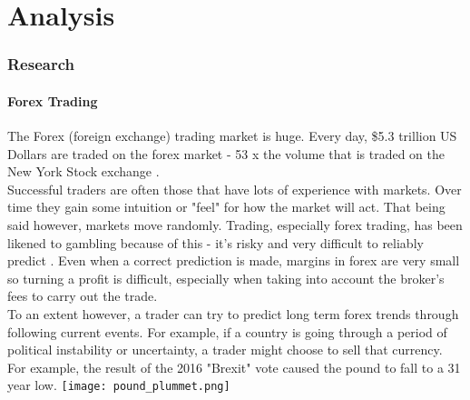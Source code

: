 
\iffalse
Fully or nearly fully scoped analysis of a real problem, presented in a way that a third party can understand.

Requirements fully documented in a set of measurable and appropriate specific objectives, covering all required functionality of the solution or areas of investigation.

Requirements arrived at by considering, through dialogue, the needs of the intended users of the system, or recipients of the outcomes for investigative projects.

Problem sufficiently well modelled to be of use in subsequent stages.		
\fi


\graphicspath{ {images/analysis/} }

\part{Analysis}

    \section{Research}
    
        \subsection{Forex Trading}
        
        The Forex (foreign exchange) trading market is huge. Every day, \$5.3 trillion US Dollars are traded on the forex market - 53 x the volume that is traded on the New York Stock exchange \cite{brokernotes_2018}.\\
        
        Successful traders are often those that have lots of experience with markets. Over time they gain some intuition or "feel" for how the market will act. That being said however, markets move randomly. Trading, especially forex trading, has been likened to gambling because of this - it's risky and very difficult to reliably predict \cite{hannah_2017}. Even when a correct prediction is made, margins in forex are very small so turning a profit is difficult, especially when taking into account the broker's fees to carry out the trade.\\

        To an extent however, a trader can try to predict long term forex trends through following current events. For example, if a country is going through a period of political instability or uncertainty, a trader might choose to sell that currency. For example, the result of the 2016 "Brexit" vote caused the pound to fall to a 31 year low. \cite{bbc_news_2016} \texttt{[image: pound\_plummet.png]}


